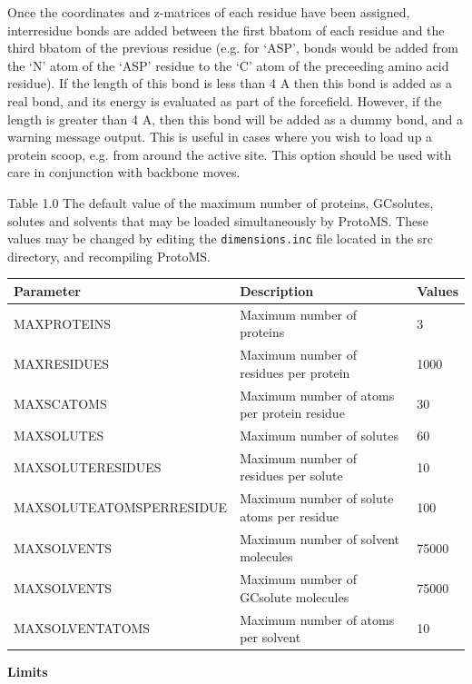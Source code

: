 \documentclass[letterpaper,10pt,english]{sphinxmanual}
\begin{document}
Once the coordinates and z-matrices of each residue have been assigned, interresidue bonds are added between the first bbatom of each residue and the third bbatom of the previous residue (e.g. for ‘ASP’, bonds would be added from the ‘N’ atom of the ‘ASP’ residue to the ‘C’ atom of the preceeding amino acid residue). If the length of this bond is less than 4 A then this bond is added as a real bond, and its energy is evaluated as part of the forcefield. However, if the length is greater than 4 A, then this bond will be added as a dummy bond, and a warning message output. This is useful in cases where you wish to load up a protein scoop, e.g. from around the active site. This option should be used with care in conjunction with backbone moves.


\begin{threeparttable}
\capstart\caption{Table 1.0 The default value of the maximum number of proteins, GCsolutes, solutes and solvents that may be loaded simultaneously by ProtoMS. These values may be changed by editing the \texttt{dimensions.inc} file located in the src directory, and recompiling ProtoMS.}\label{protoms:id3}
\begin{tabulary}{\linewidth}{|L|L|L|}
\hline
\textsf{\relax 
Parameter
} & \textsf{\relax 
Description
} & \textsf{\relax 
Values
}\\
\hline
MAXPROTEINS
 & 
Maximum number of proteins
 & 
3
\\
\hline
MAXRESIDUES
 & 
Maximum number of residues per protein
 & 
1000
\\
\hline
MAXSCATOMS
 & 
Maximum number of atoms per protein residue
 & 
30
\\
\hline
MAXSOLUTES
 & 
Maximum number of solutes
 & 
60
\\
\hline
MAXSOLUTERESIDUES
 & 
Maximum number of residues per solute
 & 
10
\\
\hline
MAXSOLUTEATOMSPERRESIDUE
 & 
Maximum number of solute atoms per residue
 & 
100
\\
\hline
MAXSOLVENTS
 & 
Maximum number of solvent molecules
 & 
75000
\\
\hline
MAXSOLVENTS
 & 
Maximum number of GCsolute molecules
 & 
75000
\\
\hline
MAXSOLVENTATOMS
 & 
Maximum number of atoms per solvent
 & 
10
\\
\hline\end{tabulary}

\end{threeparttable}


\textbf{Limits}
\end{document}

